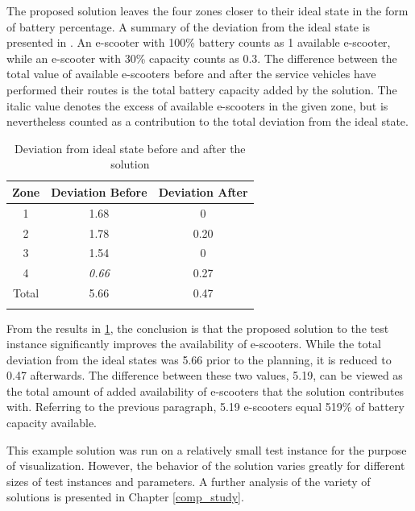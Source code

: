 The proposed solution leaves the four zones closer to their ideal state in the form of battery percentage. A summary of the deviation from the ideal state is presented in . An e-scooter with 100\% battery counts as 1 available e-scooter, while an e-scooter with 30\% capacity counts as 0.3. The difference between the total value of available e-scooters before and after the service vehicles have performed their routes is the total battery capacity added by the solution. The italic value denotes the excess of available e-scooters in the given zone, but is nevertheless counted as a contribution to the total deviation from the ideal state.
\\
\begingroup
    \setlength{\tabcolsep}{10pt} %
    \renewcommand{\arraystretch}{1} %
    \begin{table}[H]
        \centering
        \caption{Deviation from ideal state before and after the solution}
        \begin{tabular}{c|c|c}
            
             \textbf{Zone} & \textbf{Deviation Before} & \textbf{Deviation After}   \\
             \hline
             1 & 1.68 & 0\\
             2 & 1.78 & 0.20\\
             3 & 1.54 & 0\\
             4 & \textit{0.66} & 0.27\\
             \hline
             Total & 5.66 & 0.47\\
             \thickhline
        \end{tabular}
        \label{tab:deviation_ex_sol}
    \end{table}
\endgroup

From the results in \cref{tab:deviation_ex_sol}, the conclusion is that the proposed solution to the test instance significantly improves the availability of e-scooters. While the total deviation from the ideal states was 5.66 prior to the planning, it is reduced to 0.47 afterwards. The difference between these two values, 5.19, can be viewed as the total amount of added availability of e-scooters that the solution contributes with. Referring to the previous paragraph, 5.19 e-scooters equal 519\% of battery capacity available. 

This example solution was run on a relatively small test instance for the purpose of visualization. However, the behavior of the solution varies greatly for different sizes of test instances and parameters. A further analysis of the variety of solutions is presented in Chapter \ref{comp_study}.
